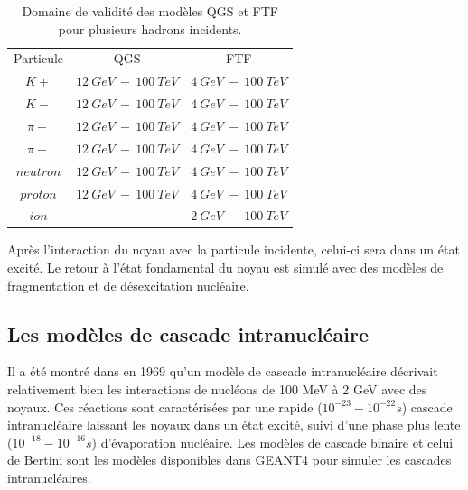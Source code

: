 \begin{table}[!ht]
  \begin{center}
    \begin{tabular}{c|c|c}
      \rowcolor{black!20!white}Particule & QGS & FTF\\
      \rowcolor{black!5!white}\hline
      \rowcolor{black!5!white}$K+$ & $12\ GeV\ -\ 100\ TeV$ & $4\ GeV\ -\ 100\ TeV$\\
      \rowcolor{black!5!white}$K-$ & $12\ GeV\ -\ 100\ TeV$ & $4\ GeV\ -\ 100\ TeV$\\
      \rowcolor{black!5!white}$\pi+$ & $12\ GeV\ -\ 100\ TeV$ & $4\ GeV\ -\ 100\ TeV$\\
      \rowcolor{black!5!white}$\pi-$ & $12\ GeV\ -\ 100\ TeV$ & $4\ GeV\ -\ 100\ TeV$\\
      \rowcolor{black!5!white}$neutron$ & $12\ GeV\ -\ 100\ TeV$ & $4\ GeV\ -\ 100\ TeV$\\
      \rowcolor{black!5!white}$proton$ & $12\ GeV\ -\ 100\ TeV$ & $4\ GeV\ -\ 100\ TeV$\\
      \rowcolor{black!5!white}$ion$ & $ $ & $2\ GeV\ -\ 100\ TeV$\\
    \end{tabular}
  \end{center}
  \caption{Domaine de validité des modèles QGS et FTF pour plusieurs hadrons incidents.}
  \label{tab.partonModelTable}
\end{table}

Après l'interaction du noyau avec la particule incidente, celui-ci sera dans un état excité. Le retour à l'état fondamental du noyau est simulé avec des modèles de fragmentation et de désexcitation nucléaire.
\subsection{Les modèles de cascade intranucléaire}
\label{sec.inucl}
Il a été montré dans \cite{bertini} en 1969 qu'un modèle de cascade intranucléaire décrivait relativement bien les interactions de nucléons de 100 MeV à 2 GeV avec des noyaux. Ces réactions sont caractérisées par une rapide ($10^{-23}-10^{-22} s$) cascade intranucléaire laissant les noyaux dans un état excité, suivi d'une phase plus lente ($10^{-18}-10^{-16} s$) d'évaporation nucléaire. Les modèles de cascade binaire et celui de Bertini sont les modèles disponibles dans GEANT4 pour simuler les cascades intranucléaires.

